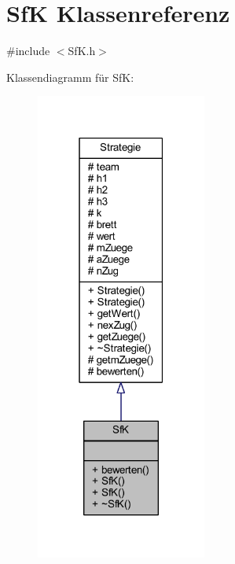 \hypertarget{class_sf_k}{}\section{Sf\+K Klassenreferenz}
\label{class_sf_k}


{\ttfamily \#include $<$Sf\+K.\+h$>$}



Klassendiagramm für Sf\+K\+:\nopagebreak
\begin{figure}[H]
\begin{center}
\leavevmode
\includegraphics[width=159pt]{class_sf_k__inherit__graph}
\end{center}
\end{figure}


